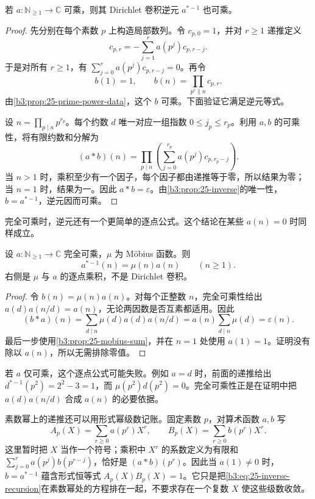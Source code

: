 \begin{proposition}[可乘函数的逆元仍可乘]
\label{b3:prop:25-inverse-multiplicative}
若 \(a:\mathbb N_{\ge1}\to\mathbb C\) 可乘，则其 Dirichlet 卷积逆元 \(a^{*-1}\) 也可乘。
\end{proposition}
\begin{proof}
先分别在每个素数 \(p\) 上构造局部数列。令 \(c_{p,0}=1\)，并对 \(r\ge1\) 递推定义
\[
 c_{p,r}=-\sum_{j=1}^r a(p^j)c_{p,r-j}.
\]
于是对所有 \(r\ge1\)，有 \(\sum_{j=0}^r a(p^j)c_{p,r-j}=0\)。再令
\[
 b(1)=1,\qquad b(n)=\prod_{p^r\parallel n}c_{p,r}.
\]
由\cref{b3:prop:25-prime-power-data}，这个 \(b\) 可乘。下面验证它满足逆元等式。

设 \(n=\prod_{p\mid n}p^{r_p}\)。每个约数 \(d\) 唯一对应一组指数 \(0\le j_p\le r_p\)。利用 \(a,b\) 的可乘性，将有限约数和分解为
\[
 (a*b)(n)
 =\prod_{p\mid n}
   \left(\sum_{j=0}^{r_p}a(p^j)c_{p,r_p-j}\right).
\]
当 \(n>1\) 时，乘积至少有一个因子，每个因子都由递推等于零，所以结果为零；当 \(n=1\) 时，结果为一。因此 \(a*b=\varepsilon\)。由\cref{b3:prop:25-inverse}的唯一性，\(b=a^{*-1}\)，逆元因而可乘。
\end{proof}

完全可乘时，逆元还有一个更简单的逐点公式。这个结论在某些 \(a(n)=0\) 时同样成立。

\begin{proposition}[完全可乘函数的卷积逆元]
\label{b3:prop:25-completely-inverse}
设 \(a:\mathbb N_{\ge1}\to\mathbb C\) 完全可乘，\(\mu\) 为 Möbius 函数。则
\[
 a^{*-1}(n)=\mu(n)a(n)\qquad(n\ge1).
\]
右侧是 \(\mu\) 与 \(a\) 的逐点乘积，不是 Dirichlet 卷积。
\end{proposition}
\begin{proof}
令 \(b(n)=\mu(n)a(n)\)。对每个正整数 \(n\)，完全可乘性给出 \(a(d)a(n/d)=a(n)\)，无论两因数是否互素都适用。因此
\[
 (b*a)(n)
 =\sum_{d\mid n}\mu(d)a(d)a(n/d)
 =a(n)\sum_{d\mid n}\mu(d)
 =\varepsilon(n).
\]
最后一步使用\cref{b3:prop:25-mobius-sum}，并在 \(n=1\) 处使用 \(a(1)=1\)。证明没有除以 \(a(n)\)，所以无需排除零值。
\end{proof}

若 \(a\) 仅可乘，这个逐点公式可能失败。例如 \(a=d\) 时，前面的递推给出 \(d^{*-1}(p^2)=2^2-3=1\)，而 \(\mu(p^2)d(p^2)=0\)。完全可乘性正是在证明中把 \(a(d)a(n/d)\) 合成 \(a(n)\) 的必要依据。

\ProseParagraphBreak

素数幂上的递推还可以用形式幂级数记账。固定素数 \(p\)，对算术函数 \(a,b\) 写
\[
 A_p(X)=\sum_{r\ge0}a(p^r)X^r,
 \qquad B_p(X)=\sum_{r\ge0}b(p^r)X^r.
\]
这里暂时把 \(X\) 当作一个符号；乘积中 \(X^r\) 的系数定义为有限和 \(\sum_{j=0}^r a(p^j)b(p^{r-j})\)，恰好是 \((a*b)(p^r)\)。因此当 \(a(1)\ne0\) 时，\(b=a^{*-1}\) 蕴含形式恒等式 \(A_p(X)B_p(X)=1\)。它只是把\eqref{b3:eq:25-inverse-recursion}在素数幂处的方程排在一起，不要求存在一个复数 \(X\) 使这些级数收敛。

